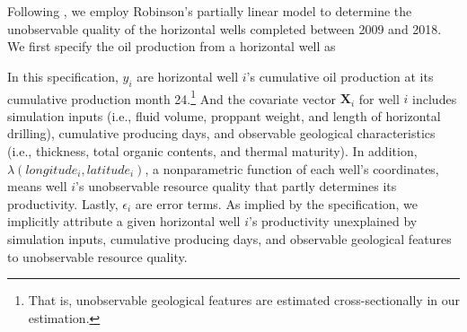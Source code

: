 Following \cite{The-Economics-of-Time-Limited-Development-Options_2020_Herrnstadt-Kellogg-and-Lewis}, we employ Robinson's partially linear model to determine the unobservable quality of the horizontal wells completed between 2009 and 2018. We first specify the oil production from a horizontal well as

In this specification, $y_{i}$ are horizontal well $i$'s cumulative oil production at its cumulative production month 24.\footnote{That is, unobservable geological features are estimated cross-sectionally in our estimation.} And the covariate vector $\boldsymbol{X}_{i}$ for well $i$ includes simulation inputs (i.e., fluid volume, proppant weight, and length of horizontal drilling), cumulative producing days, and observable geological characteristics (i.e., thickness, total organic contents, and thermal maturity). In addition, $\lambda(longitude_{i}, latitude_{i})$, a nonparametric function of each well's coordinates, means well $i$'s unobservable resource quality that partly determines its productivity. Lastly, $\epsilon_{i}$ are error terms. As implied by the specification, we implicitly attribute a given horizontal well $i$'s productivity unexplained by simulation inputs, cumulative producing days, and observable geological features to unobservable resource quality. 

